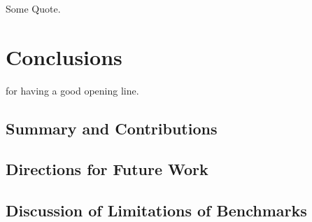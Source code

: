 \begin{savequote}[75mm]
Some Quote.
\end{savequote}


\chapter{Conclusions}
\label{Chap:Conclusions}
 for having a good opening line. 
\section{Summary and Contributions}
\section{Directions for Future Work}
\section{Discussion of Limitations of Benchmarks}




